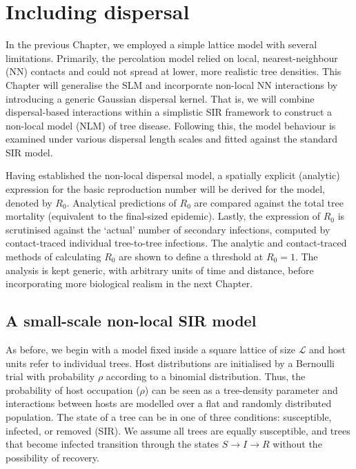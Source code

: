 \chapter{Including dispersal}

\label{ch5:dispersal-model}
In the previous Chapter, we employed a simple lattice model with several limitations. 
Primarily, the percolation model relied on local, nearest-neighbour (NN) contacts and could not spread at lower, more realistic tree densities. 
This Chapter will generalise the SLM and incorporate non-local NN interactions by introducing a generic Gaussian dispersal kernel.
That is, we will combine dispersal-based interactions within a simplistic SIR framework to construct a non-local model (NLM) of tree disease.
Following this, the model behaviour is examined under various dispersal length scales and fitted against the standard SIR model.

Having established the non-local dispersal model, a spatially explicit (analytic) expression for the basic reproduction number will be derived for the model, denoted by $R_0$.
Analytical predictions of $R_0$ are compared against the total tree mortality (equivalent to the final-sized epidemic).
Lastly, the expression of $R_0$ is scrutinised against the `actual' number of secondary infections, computed by contact-traced individual tree-to-tree infections.
The analytic and contact-traced methods of calculating $R_0$ are shown to define a threshold at $R_0=1$.
The analysis is kept generic, with arbitrary units of time and distance, before incorporating more biological realism in the next Chapter. 

\section{A small-scale non-local SIR model}
\label{section:sgm-expo}

As before, we begin with a model fixed inside a square lattice of size $\mathcal{L}$ and host units refer to individual trees.
Host distributions are initialised by a Bernoulli trial with probability $\rho$ according to a binomial distribution.
Thus, the probability of host occupation ($\rho$) can be seen as a tree-density parameter and interactions between hosts are modelled over a flat and randomly distributed population.
The state of a tree can be in one of three conditions: susceptible, infected, or removed (SIR).
We assume all trees are equally susceptible, and trees that become infected transition through the states $S\rightarrow I\rightarrow R$ without the possibility of recovery.

